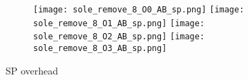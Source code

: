 \documentclass[11pt]{article}
\begin{document}
    \begin{figure}[ht]
        \begin{subfigure}{\linewidth}
            \texttt{[image: sole\_remove\_8\_O0\_AB\_sp.png]}
            \texttt{[image: sole\_remove\_8\_O1\_AB\_sp.png]}
            \texttt{[image: sole\_remove\_8\_O2\_AB\_sp.png]}
            \texttt{[image: sole\_remove\_8\_O3\_AB\_sp.png]}
        \end{subfigure}\par\medskip
        \caption{SP overhead}
        \label{fig:sole_figs_8}
    \end{figure}

\end{document}
